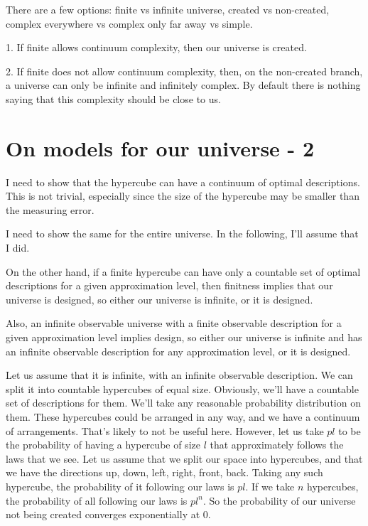 \documentclass[a4paper
,draft
]{article}
\begin{document}
There are a few options: finite vs infinite universe, created vs non-created, complex everywhere vs complex only far away vs simple.

1. If finite allows continuum complexity, then our universe is created.

2. If finite does not allow continuum complexity, then, on the non-created branch, a universe can only be infinite and infinitely complex. By default there is nothing saying that this complexity should be close to us.

\section{On models for our universe - 2}

I need to show that the hypercube can have a continuum of optimal descriptions. This is not trivial, especially since the size of the hypercube may be smaller than the measuring error.

I need to show the same for the entire universe. In the following, I'll assume that I did.

On the other hand, if a finite hypercube can have only a countable set of optimal descriptions for a given approximation level, then finitness implies that our universe is designed, so either our universe is infinite, or it is designed.

Also, an infinite observable universe with a finite observable description for a given approximation level implies design, so either our universe is infinite and has an infinite observable description for any approximation level, or it is designed.

Let us assume that it is infinite, with an infinite observable description. We can split it into countable hypercubes of equal size. Obviously, we'll have a countable set of descriptions for them. We'll take any reasonable probability distribution on them. These hypercubes could be arranged in any way, and we have a continuum of arrangements. That's likely to not be useful here. However, let us take $pl$ to be the probability of having a hypercube of size $l$ that approximately follows the laws that we see. Let us assume that we split our space into hypercubes, and that we have the directions up, down, left, right, front, back. Taking any such hypercube, the probability of it following our laws is $pl$. If we take $n$ hypercubes, the probability of all following our laws is $pl^n$. So the probability of our universe not being created converges exponentially at $0$.
\end{document}
